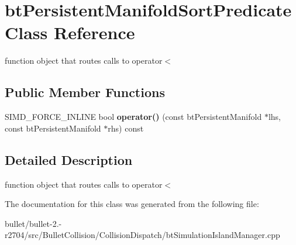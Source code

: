 \hypertarget{classbt_persistent_manifold_sort_predicate}{\section{bt\+Persistent\+Manifold\+Sort\+Predicate Class Reference}
\label{classbt_persistent_manifold_sort_predicate}
}


function object that routes calls to operator$<$  


\subsection*{Public Member Functions}
\begin{DoxyCompactItemize}
\item 
\hypertarget{classbt_persistent_manifold_sort_predicate_ac45666c263df7d7532f0d28526fe319a}{S\+I\+M\+D\+\_\+\+F\+O\+R\+C\+E\+\_\+\+I\+N\+L\+I\+N\+E bool {\bfseries operator()} (const bt\+Persistent\+Manifold $\ast$lhs, const bt\+Persistent\+Manifold $\ast$rhs) const }\label{classbt_persistent_manifold_sort_predicate_ac45666c263df7d7532f0d28526fe319a}

\end{DoxyCompactItemize}


\subsection{Detailed Description}
function object that routes calls to operator$<$ 

The documentation for this class was generated from the following file\+:\begin{DoxyCompactItemize}
\item 
bullet/bullet-\/2.-\/r2704/src/\+Bullet\+Collision/\+Collision\+Dispatch/bt\+Simulation\+Island\+Manager.\+cpp\end{DoxyCompactItemize}
